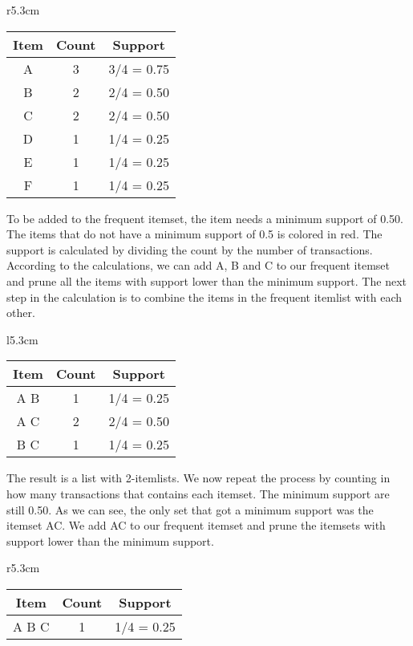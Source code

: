 	\begin{wraptable}{r}{5.3cm}
		\begin{tabular}{ c | c | c }
			\hline 
			{\bf Item} & {\bf Count} & {\bf Support} \\ \hline
			A & 3 & 3/4 = 0.75 \\
			B & 2 & 2/4 = 0.50 \\
			C & 2 & 2/4 = 0.50 \\			
			D & 1 & {\color{red}1/4 = 0.25} \\
			E & 1 & {\color{red}1/4 = 0.25} \\
			F & 1 & {\color{red}1/4 = 0.25} \\ \hline
		\end{tabular}
	\end{wraptable}
	To be added to the frequent itemset, the item needs a minimum support of 0.50.
	The items that do not have a minimum support of 0.5 is colored in red. 
	The support is calculated by dividing the count by the number of transactions.
	According to the calculations, we can add A, B and C to our frequent itemset
	and prune all the items with support lower than the minimum support.
	The next step in the calculation is to combine the items in the frequent itemlist
	with each other. 
	\begin{wraptable}{l}{5.3cm}
		\begin{tabular}{ c | c | c }
			\hline 
			{\bf Item} & {\bf Count} & {\bf Support} \\ \hline
			A B & 1 & {\color{red}1/4 = 0.25} \\
			A C & 2 & 2/4 = 0.50 \\
			B C & 1 & {\color{red}1/4 = 0.25} \\ \hline			
			
		\end{tabular}
	\end{wraptable}

	The  result is a list with 2-itemlists. We now repeat the process
	by counting in how many transactions that contains each itemset. The minimum support 
	are still 0.50. As we can see, the only set that got a minimum support was the
	itemset AC. We add AC to our frequent itemset and prune the itemsets with support
	lower than the minimum support. 
	

	\begin{wraptable}{r}{5.3cm}
		\begin{tabular}{ c | c | c }
			\hline 
			{\bf Item} & {\bf Count} & {\bf Support} \\ \hline
			A B C & 1 & {\color{red} 1/4 = 0.25} \\ \hline
		\end{tabular}
	\end{wraptable}

